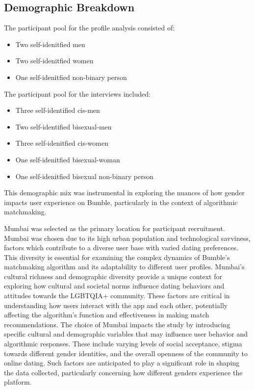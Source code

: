 \subsection{Demographic Breakdown}
The participant pool for the profile analysis consisted of:
\begin{itemize}
    \item Two self-idenitfied men
    \item Two self-idenitfied women
    \item One self-idenitfied non-binary person
\end{itemize}

The participant pool for the interviews included:
\begin{itemize}
    \item Three self-identified cis-men
    \item Two self-identified bisexual-men
    \item Three self-idenitfied cis-women
    \item One self-idenitfied bisexual-woman
    \item One self-idenitfied bisexual non-binary person
\end{itemize}
This demographic mix was instrumental in exploring the nuances of how gender impacts user experience on Bumble, particularly in the context of algorithmic matchmaking.

Mumbai was selected as the primary location for participant recruitment. Mumbai was chosen due to its high urban population and technological savviness, factors which contribute to a diverse user base with varied dating preferences. This diversity is essential for examining the complex dynamics of Bumble's matchmaking algorithm and its adaptability to different user profiles. Mumbai's cultural richness and demographic diversity provide a unique context for exploring how cultural and societal norms influence dating behaviors and attitudes towards the LGBTQIA+ community. These factors are critical in understanding how users interact with the app and each other, potentially affecting the algorithm's function and effectiveness in making match recommendations. The choice of Mumbai impacts the study by introducing specific cultural and demographic variables that may influence user behavior and algorithmic responses. These include varying levels of social acceptance, stigma towards different gender identities, and the overall openness of the community to online dating. Such factors are anticipated to play a significant role in shaping the data collected, particularly concerning how different genders experience the platform.

